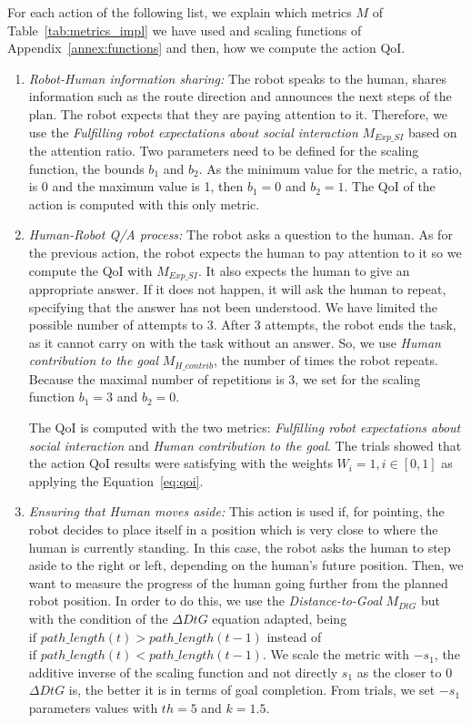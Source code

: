 \documentclass[a4paper,11pt,twoside]{StyleThese}
\begin{document}
For each action of the following list, we explain which metrics $M$ of Table~\ref{tab:metrics_impl} we have used and scaling functions of Appendix~\ref{annex:functions} and then, how we compute the action QoI. 
\begin{enumerate}[label=(\alph*)]
	\item \label{list_act:info} \textit{Robot-Human information sharing: }The robot speaks to the human, shares information such as the route direction and announces the next steps of the plan. The robot expects that they are paying attention to it. Therefore, we use the \textit{Fulfilling robot expectations about social interaction} $M_{Exp\_SI}$ based on the attention ratio. Two parameters need to be defined for the scaling function, the bounds $b_1$ and $b_2$. As the minimum value for the metric, a ratio, is 0 and the maximum value is 1, then $b_1=0$ and $b_2=1$. 
	The QoI of the action is computed with this only metric.
	
	\item \label{list_act:qa} \textit{Human-Robot Q/A process: } The robot asks a question to the human. As for the previous action, the robot expects the human to pay attention to it so we compute the QoI with $M_{Exp\_SI}$. It also expects the human to give an appropriate answer. If it does not happen, it will ask the human to repeat, specifying that the answer has not been understood. We have limited the possible number of attempts to 3. After 3 attempts, the robot ends the task, as it cannot carry on with the task without an answer. So, we use \textit{Human contribution to the goal} $M_{H\_contrib}$, the number of times the robot repeats. Because the maximal number of repetitions is 3, we set for the scaling function $b_1=3$ and $b_2=0$.
	
	The QoI is computed with the two metrics: \textit{Fulfilling robot expectations about social interaction} and \textit{Human contribution to the goal}.
	The trials showed that the action QoI results were satisfying with the weights $W_i=1, i \in [0,1]$ as applying the Equation~\eqref{eq:qoi}.
	
	\item \label{list_act:moves_aside} \textit{Ensuring that Human  moves aside: }This action is used if, for pointing, the robot decides to place itself in a position which is very close to where the human is currently standing. In this case, the robot asks the human to step aside to the right or left, depending on the human's future position. Then, we want to measure the progress of the human going further from the planned robot position. In order to do this, we use the \textit{Distance-to-Goal} $M_{DtG}$ but with the condition of the $\Delta DtG$ equation adapted, being $\text{if } path\_length(t) >  path\_length(t-1)$ instead of $\text{if } path\_length(t) <  path\_length(t-1)$. We scale the metric with  $-s_1$, the additive inverse of the scaling function and not directly $s_1$ as the closer to 0 $\Delta DtG$ is, the better it is in terms of goal completion. From trials, we set $-s_1$ parameters values with $th=5$ and $k=1.5$.
	

\end{enumerate}
\end{document}

